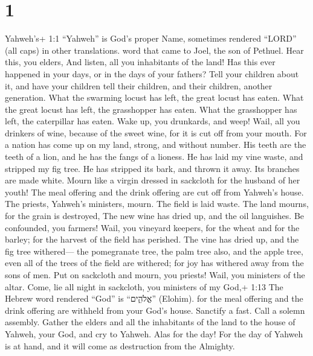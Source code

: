 \hypertarget{section}{%
\section{1}\label{section}}

 Yahweh's+ 1:1 ``Yahweh'' is God's proper Name, sometimes
rendered ``LORD'' (all caps) in other translations. word that came to
Joel, the son of Pethuel.  Hear this, you elders, And
listen, all you inhabitants of the land! Has this ever happened in your
days, or in the days of your fathers?  Tell your children
about it, and have your children tell their children, and their
children, another generation.  What the swarming locust has
left, the great locust has eaten. What the great locust has left, the
grasshopper has eaten. What the grasshopper has left, the caterpillar
has eaten.  Wake up, you drunkards, and weep! Wail, all you
drinkers of wine, because of the sweet wine, for it is cut off from your
mouth.  For a nation has come up on my land, strong, and
without number. His teeth are the teeth of a lion, and he has the fangs
of a lioness.  He has laid my vine waste, and stripped my
fig tree. He has stripped its bark, and thrown it away. Its branches are
made white.  Mourn like a virgin dressed in sackcloth for
the husband of her youth!  The meal offering and the drink
offering are cut off from Yahweh's house. The priests, Yahweh's
ministers, mourn.  The field is laid waste. The land
mourns, for the grain is destroyed, The new wine has dried up, and the
oil languishes.  Be confounded, you farmers! Wail, you
vineyard keepers, for the wheat and for the barley; for the harvest of
the field has perished.  The vine has dried up, and the fig
tree withered--- the pomegranate tree, the palm tree also, and the apple
tree, even all of the trees of the field are withered; for joy has
withered away from the sons of men.  Put on sackcloth and
mourn, you priests! Wail, you ministers of the altar. Come, lie all
night in sackcloth, you ministers of my God,+ 1:13 The Hebrew word
rendered ``God'' is ``אֱלֹהִ֑ים'' (Elohim). for the meal offering and
the drink offering are withheld from your God's house. 
Sanctify a fast. Call a solemn assembly. Gather the elders and all the
inhabitants of the land to the house of Yahweh, your God, and cry to
Yahweh.  Alas for the day! For the day of Yahweh is at
hand, and it will come as destruction from the Almighty. 
